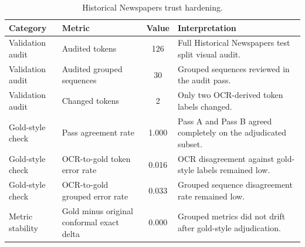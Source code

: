 \begin{table}[t]
\caption{Historical Newspapers trust hardening.}
\label{tab:appendix_trust}
\centering
\footnotesize
\setlength{\tabcolsep}{4pt}
\renewcommand{\arraystretch}{1.06}
\begin{tabular}{@{}p{2.0cm}p{3.4cm}cp{7.0cm}@{}}
\toprule
\textbf{Category} & \textbf{Metric} & \textbf{Value} & \textbf{Interpretation} \\
\midrule
Validation audit & Audited tokens & 126 & Full Historical Newspapers test split visual audit. \\
Validation audit & Audited grouped sequences & 30 & Grouped sequences reviewed in the audit pass. \\
Validation audit & Changed tokens & 2 & Only two OCR-derived token labels changed. \\
Gold-style check & Pass agreement rate & 1.000 & Pass A and Pass B agreed completely on the adjudicated subset. \\
Gold-style check & OCR-to-gold token error rate & 0.016 & OCR disagreement against gold-style labels remained low. \\
Gold-style check & OCR-to-gold grouped error rate & 0.033 & Grouped sequence disagreement rate remained low. \\
Metric stability & Gold minus original conformal exact delta & 0.000 & Grouped metrics did not drift after gold-style adjudication. \\
\bottomrule
\end{tabular}
\end{table}
